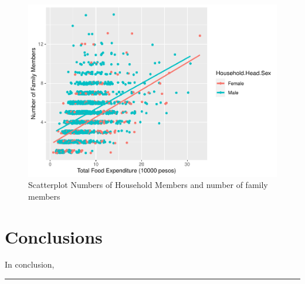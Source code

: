 \documentclass[
]{article}
\begin{document}
\begin{figure}[H]

{\centering \includegraphics[width=0.8\linewidth]{Group_01_Project2_demo_files/figure-latex/compare plot-1} 

}

\caption{Scatterplot Numbers of Household Members and number of family members}\label{fig:compare plot}
\end{figure}

\hypertarget{sec:Conc}{%
\section{Conclusions}\label{sec:Conc}}

In conclusion,

\begin{center}\rule{0.5\linewidth}{0.5pt}\end{center}
\end{document}
